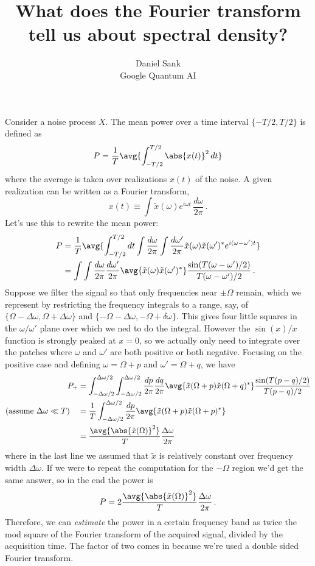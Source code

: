 \documentclass{article}
\title{What does the Fourier transform tell us about spectral density?}
\author{Daniel Sank \\ \small{Google Quantum AI}}
\begin{document}
\maketitle

Consider a noise process $X$.
The mean power over a time interval $\{-T/2,T/2\}$ is defined as
\begin{equation}
P = \frac{1}{T} \avg{\int_{-T/2}^{T/2} \abs{x(t)}^2 \, dt}
\end{equation}
where the average is taken over realizations $x(t)$ of the noise.
A given realization can be written as a Fourier transform,
\begin{equation}
x(t) \equiv
\int \tilde{x}(\omega) e^{i \omega t} \, \frac{d \omega}{2\pi} \, .
\end{equation}
Let's use this to rewrite the mean power:
\begin{align}
P
&= \frac{1}{T}\avg{
\int_{-T/2}^{T/2} dt
\int \frac{d\omega}{2\pi}
\int \frac{d\omega'}{2\pi}
\tilde{x}(\omega) \tilde{x}(\omega')^*
e^{i(\omega - \omega')t}} \nonumber \\
&= \int \int \frac{d\omega}{2\pi} \frac{d\omega'}{2\pi}
\avg{\tilde{x}(\omega)\tilde{x}(\omega')^*}
\frac{\sin(T(\omega - \omega')/2)}{T (\omega - \omega')/2} \, .
\end{align}
Suppose we filter the signal so that only frequencies near $\pm \Omega$ remain, which we represent by restricting the frequency integrals to a range, say, of $\{\Omega-\Delta \omega, \Omega+\Delta \omega\}$ and $\{-\Omega - \Delta \omega, -\Omega + \delta \omega\}$.
This gives four little squares in the $\omega/\omega'$ plane over which we ned to do the integral.
However the $\sin(x)/x$ function is strongly peaked at $x=0$, so we actually only need to integrate over the patches where $\omega$ and $\omega'$ are both positive or both negative.
Focusing on the positive case and defining $\omega = \Omega + p$ and $\omega' = \Omega + q$, we have
\begin{align}
P_+ &=
\int_{-\Delta \omega/2}^{\Delta\omega/2}
\int_{-\Delta \omega/2}^{\Delta\omega/2}
\frac{dp}{2\pi} \frac{dq}{2\pi}
\avg{\tilde{x}(\Omega+p)\tilde{x}(\Omega+q)^*} \frac{\sin(T(p-q)/2)}{T(p-q)/2} \nonumber \\
(\text{assume }\Delta \omega \ll T) \quad &=
\frac{1}{T} \int_{-\Delta \omega/2}^{\Delta \omega / 2}
\frac{dp}{2\pi} \avg{\tilde{x}(\Omega + p) \tilde{x}(\Omega + p)^*} \nonumber \\
&= \frac{\avg{\abs{\tilde{x}(\Omega)}^2}}{T} \frac{\Delta \omega}{2 \pi}
\end{align}
where in the last line we assumed that $\tilde{x}$ is relatively constant over frequency width $\Delta \omega$.
If we were to repeat the computation for the $-\Omega$ region we'd get the same answer, so in the end the power is
\begin{equation}
P = 2 \frac{\avg{\abs{\tilde{x}(\Omega)}^2}}{T} \frac{\Delta \omega}{2\pi} \, .
\end{equation}
Therefore, we can \emph{estimate} the power in a certain frequency band as twice the mod square of the Fourier transform of the acquired signal, divided by the acquisition time.
The factor of two comes in because we're used a double sided Fourier transform.
\end{document}
